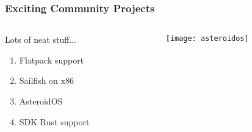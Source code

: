 \documentclass[
	notes=none,
	aspectratio=169
]{beamer}
\begin{document}
\begin{frame}
\frametitle{Exciting Community Projects}

\begin{columns}[T]
\begin{column}[T]{0.5\textwidth}
\setlength{\parskip}{0.5em}

\vspace{1.0cm}
Lots of neat stuff...
\begin{enumerate}
\setlength{\parskip}{0.5em}
\item Flatpack support
\item Sailfish on x86
\item AsteroidOS
\item SDK Rust support
\end{enumerate}

\end{column}

\begin{column}[T]{0.5\textwidth}
\setlength{\parskip}{0.5em}

\vspace{0.5cm}
\texttt{[image: asteroidos]}

\end{column}
\end{columns}

\end{frame}
\note{
}

\end{document}
